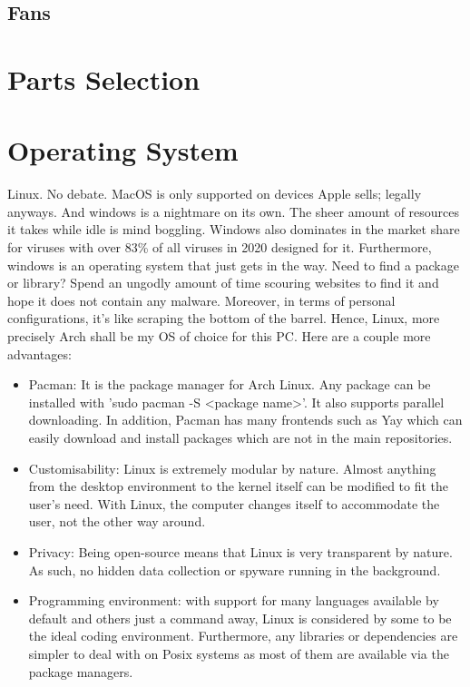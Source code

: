 \documentclass[12pt, a4paper]{article}
\begin{document}
\subsection{Fans}



\section{Parts Selection}



\section{Operating System}
Linux. No debate. MacOS is only supported on devices Apple sells; legally
anyways. And windows is a nightmare on its own. The sheer amount of resources
it takes while idle is mind boggling. Windows also dominates in the market
share for viruses with over 83\% of all viruses in 2020 designed for it.
Furthermore, windows is an operating system that just gets in the way.
Need to find a package or library? Spend an ungodly amount of time
scouring websites to find it and hope it does not contain any malware.
Moreover, in terms of personal configurations, it's like scraping the 
bottom of the barrel. Hence, Linux, more precisely Arch shall be my OS of
choice for this PC. Here are a couple more advantages:

\begin{itemize}
  \item Pacman: It is the package manager for Arch Linux. Any package can 
    be installed with 'sudo pacman -S <package name>'. It also supports 
    parallel downloading. In addition, Pacman has many frontends such 
    as Yay which can easily download and install packages which are
    not in the main repositories.
  \item Customisability: Linux is extremely modular by nature. Almost
    anything from the desktop environment to the kernel itself can
    be modified to fit the user's need. With Linux, the computer changes
    itself to accommodate the user, not the other way around.
  \item Privacy: Being open-source means that Linux is very transparent
    by nature. As such, no hidden data collection or spyware running in 
    the background.
  \item Programming environment: with support for many languages available
    by default and others just a command away, Linux is considered
    by some to be the ideal coding environment. Furthermore, any libraries
    or dependencies are simpler to deal with on Posix systems as most 
    of them are available via the package managers.
\end{itemize}

\end{document}
